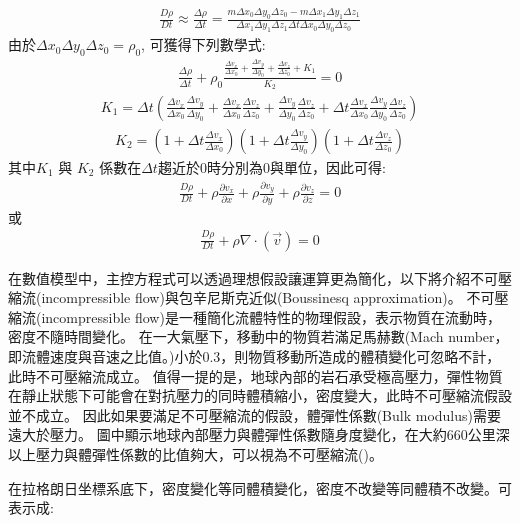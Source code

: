 \begin{align}
\frac{D\rho}{Dt} \approx \frac{\Delta \rho}{\Delta t} =\frac{m\Delta x_0 \Delta y_0 \Delta z_0-m\Delta x_1 \Delta y_1 \Delta z_1}{\Delta x_1 \Delta y_1 \Delta z_1\Delta t\Delta x_0 \Delta y_0 \Delta z_0}\label{eqn:Drho-Dt2}
\end{align}
由於$\Delta x_0 \Delta y_0 \Delta z_0=\rho_0$, 可獲得下列數學式:
\begin{align}
\frac{\Delta \rho}{\Delta t}+\rho_0\frac{\frac{\Delta v_x}{\Delta x_0}+\frac{\Delta v_y}{\Delta y_0}+\frac{\Delta v_z}{\Delta z_0}+K_1}{K_2} = 0
\end{align}
\begin{align}
K_1 = \Delta t(\frac{\Delta v_x}{\Delta x_0}\frac{\Delta v_y}{\Delta y_0}+\frac{\Delta v_x}{\Delta x_0}\frac{\Delta v_z}{\Delta z_0}+\frac{\Delta v_y}{\Delta y_0}\frac{\Delta v_z}{\Delta z_0}+\Delta t \frac{\Delta v_x}{\Delta x_0}\frac{\Delta v_y}{\Delta y_0}\frac{\Delta v_z}{\Delta z_0})
\end{align}
\begin{align}
K_2=(1+\Delta t\frac{\Delta v_x}{\Delta x_0})(1+\Delta t\frac{\Delta v_y}{\Delta y_0})(1+\Delta t\frac{\Delta v_z}{\Delta z_0})
\end{align}
其中$K_1$ 與 $K_2$ 係數在$\Delta t$趨近於$0$時分別為$0$與單位，因此可得:
\begin{align}
\frac{D\rho}{Dt}+\rho\frac{\partial v_x}{\partial x}+\rho\frac{\partial v_y}{\partial y}+\rho\frac{\partial v_z}{\partial z} = 0
\end{align}
或
\begin{align}
\frac{D\rho}{Dt}+\rho \nabla\cdot(\vec v) = 0 \label{eqn:Lagrangian continuity}
\end{align}

在數值模型中，主控方程式可以透過理想假設讓運算更為簡化，以下將介紹不可壓縮流(incompressible flow)與包辛尼斯克近似(Boussinesq approximation)。
不可壓縮流(incompressible flow)是一種簡化流體特性的物理假設，表示物質在流動時，密度不隨時間變化。
在一大氣壓下，移動中的物質若滿足馬赫數(Mach number，即流體速度與音速之比值。)小於0.3，則物質移動所造成的體積變化可忽略不計，此時不可壓縮流成立。
值得一提的是，地球內部的岩石承受極高壓力，彈性物質在靜止狀態下可能會在對抗壓力的同時體積縮小，密度變大，此時不可壓縮流假設並不成立。
因此如果要滿足不可壓縮流的假設，體彈性係數(Bulk modulus)需要遠大於壓力。
圖中顯示地球內部壓力與體彈性係數隨身度變化，在大約660公里深以上壓力與體彈性係數的比值夠大，可以視為不可壓縮流()。

在拉格朗日坐標系底下，密度變化等同體積變化，密度不改變等同體積不改變。可表示成:

